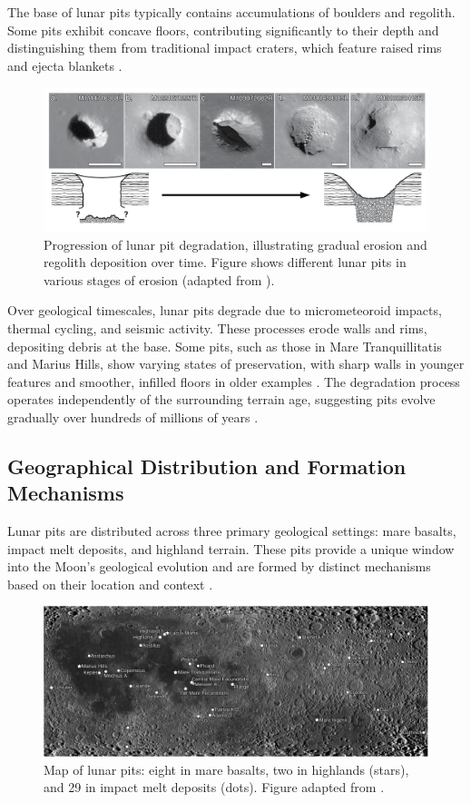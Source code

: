 The base of lunar pits typically contains accumulations of boulders and regolith. Some pits exhibit concave floors, contributing significantly to their depth and distinguishing them from traditional impact craters, which feature raised rims and ejecta blankets \cite{new-wagner}.

\begin{figure}[H]
    \centering
    \includegraphics[width=0.85\linewidth]{closed_and_open_cavities.png}
    \caption{Progression of lunar pit degradation, illustrating gradual erosion and regolith deposition over time. Figure shows different lunar pits in various stages of erosion (adapted from \cite{new-wagner}).}
    \label{fig:lunar-pit-degradation}
\end{figure}

Over geological timescales, lunar pits degrade due to micrometeoroid impacts, thermal cycling, and seismic activity. These processes erode walls and rims, depositing debris at the base. Some pits, such as those in Mare Tranquillitatis and Marius Hills, show varying states of preservation, with sharp walls in younger features and smoother, infilled floors in older examples \cite{lunar-pit-distribution}. The degradation process operates independently of the surrounding terrain age, suggesting pits evolve gradually over hundreds of millions of years \cite{new-wagner, lunar-pits-numerical-modelling}.

\subsection{Geographical Distribution and Formation Mechanisms}

Lunar pits are distributed across three primary geological settings: mare basalts, impact melt deposits, and highland terrain. These pits provide a unique window into the Moon's geological evolution and are formed by distinct mechanisms based on their location and context \cite{lunar-pit-distribution, lunar-pits-numerical-modelling}.

\begin{figure}[H]
    \centering
    \includegraphics[width=0.76\linewidth]{map-lunar-pits-rough.png}
    \caption{Map of lunar pits: eight in mare basalts, two in highlands (stars), and 29 in impact melt deposits (dots). Figure adapted from \cite{lunar-pit-distribution}.}
    \label{fig:map-lunar-pits}
\end{figure}

